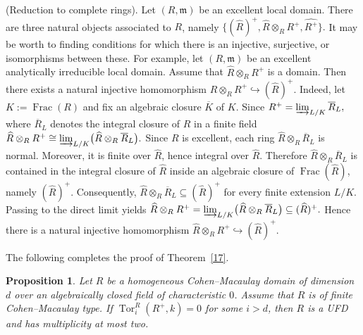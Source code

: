 \documentclass[11pt,a4paper]{amsart}
\numberwithin{equation}{section}
\newtheorem{proposition}[theorem]{Proposition}
\theoremstyle{definition}
\theoremstyle{remark}
\begin{document}
\begin{discussion}(Reduction to complete rings).
Let $(R,\mathfrak m)$ be an excellent local domain. There are three natural
objects associated to $R$, namely
\(\{
(\widehat{R})^+,
\widehat{R}\otimes_R R^+,
\widehat{R^+}\}.
\)
It may be worth to finding conditions for which there is an
injective, surjective, or isomorphisms between these.
For example, let $(R,\mathfrak m)$ be an excellent analytically irreducible local domain.
Assume that
$
\widehat R\otimes_R R^+
$
is a domain. Then there exists a natural injective homomorphism
$
\widehat R\otimes_R R^+
\hookrightarrow
(\widehat R)^+.
$ Indeed, let $K:=\operatorname{Frac}(R)$ and fix an algebraic closure $\overline K$ of
$K$. Since
$
R^+=\varinjlim_{L/K} \overline R_L,
$
where $\overline R_L$ denotes the integral closure of $R$ in a finite field
$
\widehat R\otimes_R R^+
\cong
\varinjlim_{L/K}
\bigl(\widehat R\otimes_R \overline R_L\bigr).
$ Since $R$ is excellent, each ring
$
\widehat R\otimes_R \overline R_L
$
is normal. Moreover, it is finite over $\widehat R$, hence integral over
$\widehat R$. Therefore
$
\widehat R\otimes_R \overline R_L
$
is contained in the integral closure of $\widehat R$ inside an algebraic
closure of $\operatorname{Frac}(\widehat R)$, namely $(\widehat R)^+$.
Consequently,
$
\widehat R\otimes_R \overline R_L
\subseteq
(\widehat R)^+
$
for every finite extension $L/K$. Passing to the direct limit yields
$
\widehat R\otimes_R R^+
=
\varinjlim_{L/K}
\bigl(\widehat R\otimes_R \overline R_L\bigr)
\subseteq
(\widehat R)^+.
$	Hence there is a natural injective homomorphism
$
\widehat R\otimes_R R^+
\hookrightarrow
(\widehat R)^+.
$
\end{discussion}
The following completes the proof of Theorem~\ref{17}.

\begin{proposition}\label{thm:finite-CM-type}
	Let \(R\) be a homogeneous Cohen--Macaulay domain of dimension \(d\) over an algebraically closed field of characteristic \(0\). Assume that \(R\) is of finite Cohen--Macaulay type. If
	\(
	\operatorname{Tor}_i^R(R^+, k) = 0
	\)
	for some \(i > d\), then \(R\) is a UFD and has multiplicity at most two.
\end{proposition}
\end{document}
